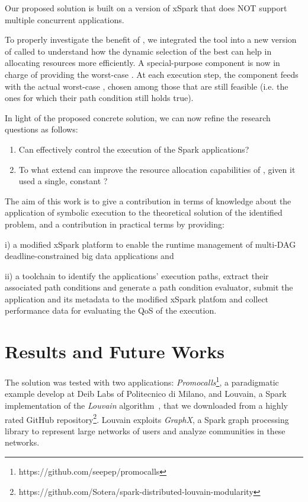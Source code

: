 Our proposed solution is built on a version of xSpark that does NOT support  multiple concurrent applications.


To properly investigate the benefit of \dSymb, we integrated the tool into a new version of  \cSpark called \tool to understand how the dynamic selection of the best \plan can help in allocating resources more efficiently. A special-purpose component is now in charge of providing the worst-case \plan. At each execution step, the component feeds \cSpark with the actual worst-case \plan, chosen among those that are still feasible (i.e. the ones for which their path condition still holds true). 

In light of the proposed concrete solution, we can now refine the research questions as follows:

\begin{enumerate}[\boldmath$RQ_1 : $] 
	\item Can \dSymb effectively control the execution of the Spark applications?
	\item To what extend can \dSymb improve the resource allocation capabilities of
	\cSpark, given it used a single, constant \plan?
\end{enumerate}

 The aim of this work is to give a contribution in terms of knowledge about the application of symbolic execution to the theoretical solution of the identified  problem, and a contribution in practical terms by providing: 
 
 i) a modified xSpark platform to enable the runtime management of multi-DAG deadline-constrained big data applications and 
 
 ii) a toolchain to identify the applications' execution paths,  extract their associated path conditions and generate a path condition evaluator, submit the application and its metadata to the modified xSpark platfom and collect performance data for evaluating the QoS of the execution. 

\section*{Results and Future Works}\label{sec:results_future_works}
The solution was tested with two applications:  \textit{Promocalls}\footnote{https://github.com/seepep/promocalls}, a paradigmatic example  develop at Deib Labs of Politecnico di Milano, and Louvain, a Spark implementation of the \textit{Louvain} algorithm~\cite{Louvain}, that we downloaded from a highly rated GitHub repository\footnote{https://github.com/Sotera/spark-distributed-louvain-modularity}. Louvain exploits \textit{GraphX}, a Spark graph processing library to represent large networks of users and analyze communities in these networks. 

